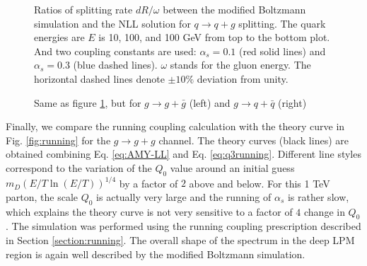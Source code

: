 \begin{figure}
\caption{Ratios of splitting rate $dR/\omega$ between the modified Boltzmann simulation and the NLL solution for $q\rightarrow q+g$ splitting. The quark energies are $E$ is 10, 100, and 100 GeV from top to the bottom plot. 
And two coupling constants are used: $\alpha_s = 0.1$ (red solid lines) and $\alpha_s = 0.3$ (blue dashed lines).
$\omega$ stands for the gluon energy.
The horizontal dashed lines denote $\pm 10\%$ deviation from unity. }
\label{fig:sys-q2qg}
\end{figure}

\begin{figure}
\caption{Same as figure \ref{fig:sys-q2qg}, but for $g \rightarrow g + \bar{g}$ (left) and $g \rightarrow q + \bar{q}$ (right)}
\label{fig:sys-g2gg-g2qqbar}
\end{figure}


Finally, we compare the running coupling calculation with the theory curve in Fig. \ref{fig:running} for the $g\rightarrow g+g$ channel.
The theory curves (black lines) are obtained combining Eq. \ref{eq:AMY-LL} and Eq. \ref{eq:q3running}.
Different line styles correspond to the variation of the $Q_0$ value around an initial guess $m_D (E/T \ln(E/T) )^{1/4}$ by a factor of $2$ above and below.
For this 1 TeV parton, the scale $Q_0$ is actually very large and the running of $\alpha_s$ is rather slow, which explains the theory curve is not very sensitive to a factor of $4$ change in $Q_0$.
The simulation was performed using the running coupling prescription described in Section \ref{section:running}.
The overall shape of the spectrum in the deep LPM region is again well described by the modified Boltzmann simulation. 

